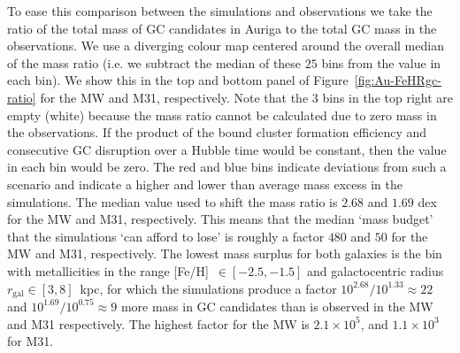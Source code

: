 \documentclass[a4paper,fleqn,usenatbib]{mnras}
\begin{document}
To ease this comparison between the simulations and observations we take the ratio
of the total mass of GC candidates in Auriga to the total GC mass in the observations.
We use a diverging colour map centered around the overall median of the 
mass ratio (i.e. we subtract the median of these $25$ bins from the value 
in each bin). We show this in the top and bottom panel of Figure~\ref{fig:Au-FeHRgc-ratio}
for the MW and M31, respectively. Note that the 3 bins in the top right are empty (white)
because the mass ratio cannot be calculated due to zero mass in the observations.
If the product of the bound cluster formation efficiency and consecutive GC 
disruption over a Hubble time would be constant, then the value in each bin would
be zero. The red and blue bins indicate deviations from such a scenario and
indicate a higher and lower than average mass excess in the simulations. The median 
value used to shift the mass ratio is $2.68$ and $1.69$ dex for the MW and M31, 
respectively. This means that the median `mass budget' that the simulations `can 
afford to lose' is roughly a factor $480$ and $50$ for the MW and M31, respectively. 
The lowest mass surplus for both galaxies is the bin with metallicities in the range
[Fe/H]~$\in [-2.5, -1.5]$ and galactocentric radius $r_{\text{gal}}\in [3,8]$~kpc,
for which the simulations produce 
a factor $10^{2.68}/10^{1.33} \approx 22$ and $10^{1.69}/10^{0.75} \approx 9$ 
more mass in GC candidates than is observed in the MW and M31 respectively.
The highest factor for the MW is $2.1 \times 10^{5}$, and $1.1 \times 10^{3}$
for M31.
\end{document}
